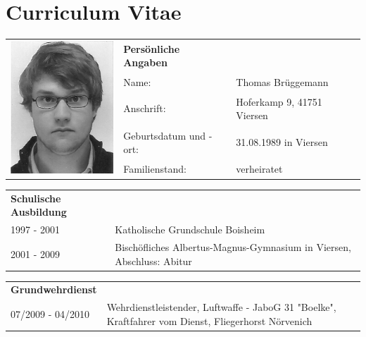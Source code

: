 \section*{Curriculum Vitae} 

\begin{flushleft}

\begin{tabular}{p{11em} p{10em} p{10em}}
    \multirow{5}{*}{\includegraphics[width=40mm]{figures/passfoto.jpg}} & \textbf{Persönliche Angaben} & \addspace \\
    & Name: & Thomas Brüggemann \\
    & Anschrift: & Hoferkamp 9, 41751 Viersen \\
    & Geburtsdatum und -ort: & 31.08.1989 in  Viersen \\
    & Familienstand: & verheiratet \\
\end{tabular}

\vspace{2.7em}

\begin{tabular}{p{11em} p{22.5em}}
    \textbf{Schulische Ausbildung} & \addspace \\
    1997 - 2001 & Katholische Grundschule Boisheim \\
    2001 - 2009 & Bischöfliches Albertus-Magnus-Gymnasium in Viersen, Abschluss: Abitur \\
\end{tabular}

\vspace{0.5em}

\begin{tabular}{p{11em} p{22.5em}}
    \textbf{Grundwehrdienst} & \addspace \\
    07/2009 - 04/2010 & \raggedright Wehrdienstleistender, Luftwaffe - JaboG 31 "Boelke", Kraftfahrer vom Dienst, Fliegerhorst Nörvenich \\
\end{tabular}


\end{flushleft}
